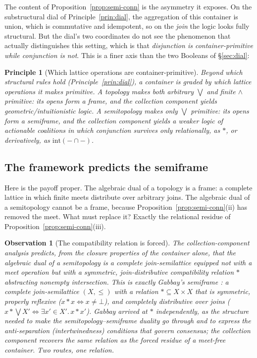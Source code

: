 \documentclass[11pt]{article}
\theoremstyle{definition}
\theoremstyle{plain}
\newtheorem{principle}[definition]{Principle}
\newtheorem{observation}[definition]{Observation}
\begin{document}
The content of Proposition~\ref{prop:semi-conn} is the asymmetry it exposes.
On the substructural dial of Principle~\ref{prin:dial}, the aggregation of this
container is union, which is commutative and idempotent, so on the \emph{join}
the logic looks fully structural. But the dial's two coordinates do not see the
phenomenon that actually distinguishes this setting, which is that
\emph{disjunction is container-primitive while conjunction is not}. This is a
finer axis than the two Booleans of \S\ref{sec:dial}:

\begin{principle}[Which lattice operations are container-primitive]
\label{prin:primitive}
Beyond \emph{which structural rules hold} (Principle~\ref{prin:dial}), a
container is graded by \emph{which lattice operations it makes primitive}. A
topology makes both arbitrary $\bigvee$ and finite $\wedge$ primitive: its
opens form a frame, and the collection component yields geometric/intuitionistic
logic. A semitopology makes only $\bigvee$ primitive: its opens form a
\emph{semiframe}, and the collection component yields a weaker logic of
actionable coalitions in which conjunction survives only relationally, as $*$,
or derivatively, as $\mathrm{int}(-\cap-)$.
\end{principle}

\subsection{The framework predicts the semiframe}

Here is the payoff proper. The algebraic dual of a topology is a frame: a
complete lattice in which finite meets distribute over arbitrary joins. The
algebraic dual of a semitopology cannot be a frame, because
Proposition~\ref{prop:semi-conn}(ii) has removed the meet. What must replace
it? Exactly the relational residue of Proposition~\ref{prop:semi-conn}(iii).

\begin{observation}[The compatibility relation is forced]
\label{obs:semiframe}
The collection-component analysis predicts, from the closure properties of the
container alone, that the algebraic dual of a semitopology is a complete
join-semilattice equipped not with a meet operation but with a symmetric,
join-distributive compatibility relation $*$ abstracting nonempty intersection.
This is exactly Gabbay's \emph{semiframe} \cite{GabbaySemiframes}: a complete
join-semilattice $(X,\le)$ with a relation ${*}\subseteq X\times X$ that is
symmetric, properly reflexive ($x * x \Leftrightarrow x\neq\bot$), and
completely distributive over joins
($x * \bigvee X' \Leftrightarrow \exists x'\!\in X'.\,x * x'$). Gabbay arrived
at $*$ independently, as the structure needed to make the
semitopology--semiframe duality go through and to express the anti-separation
(intertwinedness) conditions that govern consensus; the collection component
recovers the same relation as the forced residue of a meet-free container. Two
routes, one relation.
\end{observation}
\end{document}
